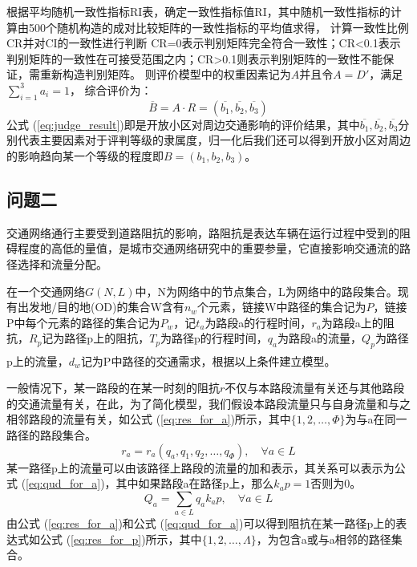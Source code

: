 \documentclass[fontset=fandol,a4paper,12pt]{ctexart}
\newcommand{\upcite}[1]{\textsuperscript{\textsuperscript{\cite{#1}}}}
\renewcommand{\eqref}[1]{公式 (\ref{#1})}
\begin{document}
			根据平均随机一致性指标RI表，确定一致性指标值RI，其中随机一致性指标的计算由500个随机构造的成对比较矩阵的一致性指标的平均值求得，
			计算一致性比例CR并对CI的一致性进行判断
			CR=0表示判别矩阵完全符合一致性；CR<0.1表示判别矩阵的一致性在可接受范围之内；CR>0.1则表示判别矩阵的一致性不能保证，需重新构造判别矩阵。
			则评价模型中的权重因素记为$A$并且令$ A=D' $，满足$ \sum\limits_{i=1}^{3}a_i=1 $，
			综合评价为：
			\begin{equation}
				\overline{B}=A \cdot R=(\overline{b_1},\overline{b_2},\overline{b_3}) 
				\label{eq:judge_result}
			\end{equation}
			\eqref{eq:judge_result}即是开放小区对周边交通影响的评价结果，其中$\overline{b_1},\overline{b_2},\overline{b_3}$分
			别代表主要因素对于评判等级的隶属度，归一化后我们还可以得到开放小区对周边的影响趋向某一个等级的程度即$ B=(b_1,b_2,b_3) $。

	\subsection{问题二}
		交通网络通行主要受到道路阻抗的影响，路阻抗是表达车辆在运行过程中受到的阻碍程度的高低的量值，是城市交通网络研究中的重要参量，它直接影响交通流的路径选择和流量分配。
		
		在一个交通网络$G(N,L)$中，N为网络中的节点集合，L为网络中的路段集合。现有出发地/目的地(OD)的集合W含有$n_w$个元素，链接W中路径的集合记为$P$，链接P中每个元素的路径的集合记为$P_w$，记$t_a$为路段a的行程时间，$r_a$为路段a上的阻抗，$R_p$记为路径p上的阻抗，$T_p$为路径p的行程时间，$q_a$为路段a的流量，$Q_p$为路径p上的流量，$d_w$记为P中路径的交通需求，根据以上条件建立模型\upcite{赵春雪2012拥挤交通网络的}。
		
		一般情况下，某一路段的在某一时刻的阻抗$r$不仅与本路段流量有关还与其他路段的交通流量有关，在此，为了简化模型，我们假设本路段流量只与自身流量和与之相邻路段的流量有关，如\eqref{eq:res_for_a}所示，其中$\{1,2,\dots,\varPhi\}$为与a在同一路径的路段集合。
		\begin{equation}
			r_a=r_a(q_a,q_1,q_2,\dots,q_\varPhi),\quad\forall a \in L
			\label{eq:res_for_a}
		\end{equation}
		某一路径p上的流量可以由该路径上路段的流量的加和表示，其关系可以表示为\eqref{eq:qud_for_a}，其中如果路段a在路径p上，那么$k_ap=1$否则为0。
		\begin{equation}
			Q_a=\sum\limits_{a\in L}q_ak_ap,\quad\forall a \in L
			\label{eq:qud_for_a}
		\end{equation}
		由\eqref{eq:res_for_a}和\eqref{eq:qud_for_a}可以得到阻抗在某一路径p上的表达式如\eqref{eq:res_for_p}所示，其中$\{1,2,\dots,\Lambda\}$，为包含a或与a相邻的路径集合。
		
\end{document}
